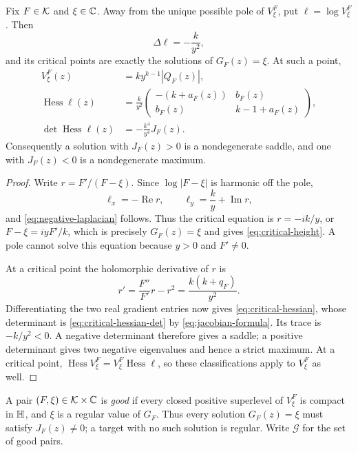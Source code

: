 \begin{lemma}
\label{lem:critical-signs}
Fix $F\in\mathcal K$ and $\xi\in\mathbb C$.  Away from the unique possible pole of
$V^F_\xi$, put $\ell=\log V^F_\xi$.  Then
\begin{equation}
 \Delta\ell=-\frac{k}{y^2},
 \label{eq:negative-laplacian}
\end{equation}
and its critical points are exactly the solutions of $G_F(z)=\xi$.
At such a point,
\begin{align}
 V^F_\xi(z)&=k y^{k-1}|Q_F(z)|,
 \label{eq:critical-height}\\
 \operatorname{Hess}\ell(z)
 &=\frac{k}{y^2}
 \begin{pmatrix}
  -(k+a_F(z))&b_F(z)\\
  b_F(z)&k-1+a_F(z)
 \end{pmatrix},
 \label{eq:critical-hessian}\\
 \det\operatorname{Hess}\ell(z)&=-\frac{k^4}{y^4}J_F(z).
 \label{eq:critical-hessian-det}
\end{align}
Consequently a solution with $J_F(z)>0$ is a nondegenerate saddle,
and one with $J_F(z)<0$ is a nondegenerate maximum.
\end{lemma}

\begin{proof}
Write $r=F'/(F-\xi)$.  Since $\log|F-\xi|$ is harmonic off the pole,
\[
 \ell_x=-\operatorname{Re}r,\qquad
 \ell_y=\frac{k}{y}+\operatorname{Im}r,
\]
and \eqref{eq:negative-laplacian} follows.  Thus the critical equation is
$r=-ik/y$, or $F-\xi=iyF'/k$, which is precisely $G_F(z)=\xi$ and gives
\eqref{eq:critical-height}.  A pole cannot solve this equation because
$y>0$ and $F'\ne0$.

At a critical point the holomorphic derivative of $r$ is
\[
 r'=\frac{F''}{F'}r-r^2
     =\frac{k(k+q_F)}{y^2}.
\]
Differentiating the two real gradient entries now gives
\eqref{eq:critical-hessian}, whose determinant is
\eqref{eq:critical-hessian-det} by \eqref{eq:jacobian-formula}.
Its trace is $-k/y^2<0$.  A negative determinant therefore gives a saddle;
a positive determinant gives two negative eigenvalues and hence a strict
maximum.  At a critical point,
$\operatorname{Hess}V^F_\xi=V^F_\xi\operatorname{Hess}\ell$, so these
classifications apply to $V^F_\xi$ as well.
\end{proof}

\begin{definition}
\label{def:good-pair}
A pair $(F,\xi)\in\mathcal K\times\mathbb C$ is \emph{good} if every closed positive
superlevel of $V^F_\xi$ is compact in $\mathbb H$, and $\xi$ is a regular value
of $G_F$.  Thus every solution $G_F(z)=\xi$ must satisfy $J_F(z)\ne0$;
a target with no such solution is regular.  Write $\mathcal G$ for the
set of good pairs.
\end{definition}

